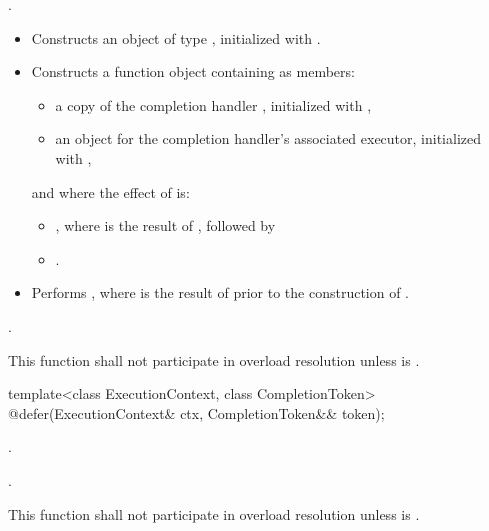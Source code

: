 \begin{itemdescr}
\pnum
\completionsig {}.

\pnum
\effects
\begin{itemize}
\item
 Constructs an object  of type , initialized with .
\item
Constructs a function object  containing as members:
\begin{itemize}
\item
a copy of the completion handler , initialized with ,
\item
an  object  for the completion handler's associated executor, initialized with ,
\end{itemize}
and where the effect of  is:
\begin{itemize}
\item
{}, where  is the result of , followed by
\item
{}.
\end{itemize}
\item
 Performs , where  is the result of  prior to the construction of .
\end{itemize}

\pnum
\returns {}.

\pnum
\remarks This function shall not participate in overload resolution unless
 is .
\end{itemdescr}

\begin{itemdecl}
template<class ExecutionContext, class CompletionToken>
  @\DEDUCED@ defer(ExecutionContext& ctx, CompletionToken&& token);
\end{itemdecl}

\begin{itemdescr}
\pnum
\completionsig {}.

\pnum
\returns {}.

\pnum
\remarks This function shall not participate in overload resolution
unless  is .
\end{itemdescr}



